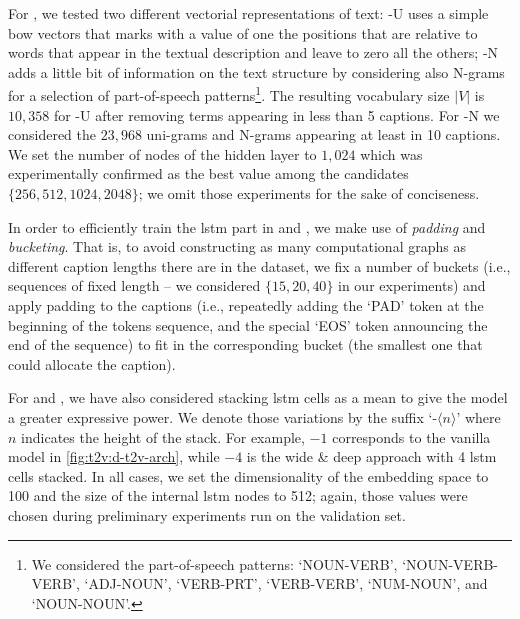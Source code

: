 For \sparsettv{}, we tested two different vectorial representations of text: \sparsettv{}\textsc{-U} uses a simple \acrlong{bow} vectors that marks with a value of one the positions that are relative to words that appear in the textual description and leave to zero all the others; \sparsettv{}\textsc{-N} adds a little bit of information on the text structure by considering also N-grams for a selection of part-of-speech patterns\footnote{We considered the part-of-speech patterns: `NOUN-VERB', `NOUN-VERB-VERB', `ADJ-NOUN', `VERB-PRT', `VERB-VERB', `NUM-NOUN', and `NOUN-NOUN'.}.
The resulting vocabulary size $|V|$ is $10,358$ for \sparsettv{}\textsc{-U} after removing terms appearing in less than 5 captions.
For \sparsettv{}\textsc{-N} we considered the $23,968$ uni-grams and N-grams appearing at least in 10 captions.
We set the number of nodes of the hidden layer to $1,024$ which was experimentally confirmed as the best value among the candidates $\{ 256, 512, 1024, 2048 \}$;
we omit those experiments for the sake of conciseness.

In order to efficiently train the \gls{lstm} part in \densettv{} and \widedeepttv{}, we make use of \emph{padding} and \emph{bucketing}.
That is, to avoid constructing as many computational graphs as different caption lengths there are in the dataset, we fix a number of buckets (i.e.,  sequences of fixed length -- we considered $\{15, 20, 40\}$ in our experiments) and apply padding to the captions (i.e.,  repeatedly adding the `PAD' token at the beginning of the tokens sequence, and the special `EOS' token announcing the end of the sequence) to fit in the corresponding bucket (the smallest one that could allocate the caption).

For \densettv{} and \widedeepttv{}, we have also considered stacking \gls{lstm} cells as a mean to give the model a greater expressive power.
We denote those variations by the suffix `-$\langle n\rangle$' where $n$ indicates the height of the stack.
For example, \densettv{}$-1$ corresponds to the vanilla model in \ref{fig:t2v:d-t2v-arch}, while \widedeepttv{}$-4$ is the wide \& deep approach with 4 \gls{lstm} cells stacked.
In all cases, we set the dimensionality of the embedding space to 100 and the size of the internal \gls{lstm} nodes to 512;
again, those values were chosen during preliminary experiments run on the validation set.

